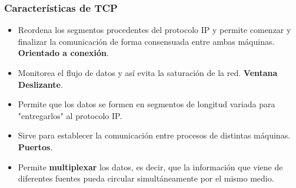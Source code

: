 \subsubsection{Características de TCP}
\begin{itemize}
    \item Reordena los segmentos procedentes del protocolo IP y permite comenzar y finalizar la comunicación de forma consensuada entre ambas máquinas. \textbf{Orientado a conexión}.
    \item Monitorea el flujo de datos y así evita la saturación de la red. \textbf{Ventana Deslizante}.
    \item Permite que los datos se formen en segmentos de longitud variada para "entregarlos" al protocolo IP.
    \item Sirve para establecer la comunicación entre procesos de distintas máquinas. \textbf{Puertos}.
    \item Permite \textbf{multiplexar} los datos, es decir, que la información que viene de diferentes fuentes pueda circular simultáneamente por el mismo medio.
\end{itemize}
